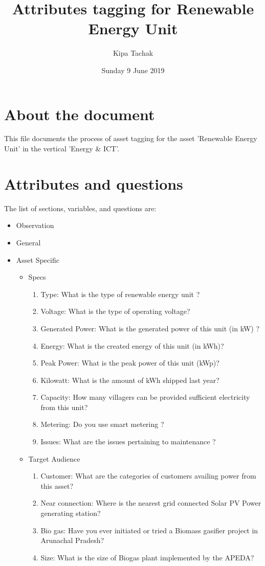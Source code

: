 \documentclass[oneside,twocolumn]{article}
\title{Attributes tagging for Renewable Energy Unit}
\author{Kipa Tachak}
\date{Sunday  9 June 2019}
\begin{document}
\maketitle

\section{About the document}
This file documents the process of asset tagging for the asset 'Renewable Energy Unit' in the
vertical 'Energy \& ICT'.

\section{Attributes and questions}
The list of sections, variables, and questions are:
    \begin{itemize}
    \item Observation
    \item General
    \item Asset Specific
    \begin{itemize}
\item Specs
\begin{enumerate}
\item Type: What is the type of renewable energy unit ?
\item Voltage: What is the type of operating voltage? 
\item Generated Power: What is the generated power of this unit (in kW) ?
\item Energy: What is the created energy of this unit (in kWh)?
\item Peak Power: What is the peak power of this unit (kWp)?
\item Kilowatt: What is the amount of kWh shipped last year?
\item Capacity: How many villagers can be provided sufficient electricity from this unit?
\item Metering: Do you use smart metering ?
\item Issues: What are the issues pertaining to maintenance ?
\end{enumerate}

\item Target Audience
\begin{enumerate}
\item Customer: What are the categories of customers availing power from this asset?
\item Near connection: Where is the nearest grid connected Solar PV Power generating station?
\item Bio gas: Have you ever initiated or tried a Biomass gasifier project in Arunachal Pradesh?
\item Size: What is the size of Biogas plant implemented by the APEDA?
\end{enumerate}


\end{itemize}
\end{itemize}
\end{document}
